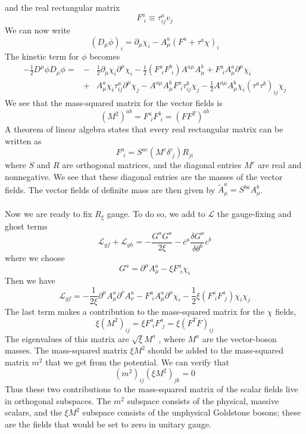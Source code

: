 and the real rectangular matrix
\[F^a_{\phantom{i}i} \equiv \tau^a_{ij}v_j\]
We can now write
\[(D_{\mu}\phi)_i = \partial_{\mu}\chi_i - A^a_{\mu}(F^a+\tau^a\chi)_i\]
The kinetic term for $\phi$ becomes
\begin{eqnarray}
-\frac{1}{2}D^{\mu}\phi D_{\mu}\phi = &-& \frac{1}{2}\partial_{\mu}\chi_i \partial^{\mu}\chi_i - \frac{1}{2}(F^a_{\phantom{i}i} F^b_{\phantom{i}i})A^{a\mu}A^b_{\mu} + F^a_{\phantom{i}i} A^a_{\mu}\partial^{\mu}\chi_i \nonumber \\
&+& A^a_{\mu}\chi_i \tau^a_{ij}\partial^{\mu}\chi_j - A^{a\mu}A^b_{\mu} F^a_{\phantom{i}i} \tau^b_{ij} \chi_j - \frac{1}{2}A^{a\mu}A^b_{\mu}\chi_i (\tau^a \tau^b)_{ij}\chi_j \nonumber
\end{eqnarray}
We see that the mass-squared matrix for the vector fields is
\[(M^2)^{ab} = F^a_{\phantom{i}i} F^b_{\phantom{i}i} = (FF^T)^{ab}\]
A theorem of linear algebra states that every real rectangular matrix can be written as
\[F^a_{\phantom{i}i} = S^{ac}(M^c\delta^c_{\phantom{i}j})R_{ji}\]
where $S$ and $R$ are orthogonal matrices, and the diagonal entries $M^c$ are real and nonnegative. We see that these diagonal entries are the masses of the vector fields. The vector fields of definite mass are then given by $\widetilde{A}^{a}_{\mu} = S^{ba}A^b_{\mu}$.
\\ \\
Now we are ready to fix $R_{\xi}$ gauge. To do so, we add to $\mathcal{L}$ the gauge-fixing and ghost terms
\[\mathcal{L}_{gf} + \mathcal{L}_{gh} = - \frac{G^aG^a}{2\xi} - \overline{c}^a\frac{\delta G^a}{\delta \theta^b} c^b \]
where we choose
\[G^a = \partial^{\mu}A^a_{\mu} - \xi F^a_{\phantom{i}i} 
\chi_i\]
Then we have
\[\mathcal{L}_{gf} = -\frac{1}{2\xi} \partial^{\mu}A^a_{\mu} \partial^{\nu}A^a_{\nu} - F^a_{\phantom{i}i} A^a_{\mu}\partial^{\mu}\chi_i - \frac{1}{2}\xi (F^a_{\phantom{i}i} F^a_{\phantom{i}j})\chi_i\chi_j\]
The last term makes a contribution to the mass-squared matrix for the $\chi$ fields,
\[\xi(M^2)_{ij} = \xi F^a_{\phantom{i}i} F^a_{\phantom{i}j} = \xi(F^TF)_{ij}\]
The eigenvalues of this matrix are $\sqrt{\xi}M^a$ , where
$M^a$ are the vector-boson masses. The mass-squared matrix $\xi M^2$ should be added to the mass-squared matrix $m^2$ that we get from the potential. We can verify that
\[(m^2)_{ij}(\xi M^2)_{jk} = 0\]
Thus these two contributions to the mass-squared matrix of the scalar fields live in orthogonal subspaces. The $m^2$ subspace consists of the physical, massive scalars, and the $\xi M^2$ subspace consists of the unphysical Goldstone bosons; these are the fields that would be set to zero in unitary gauge.
